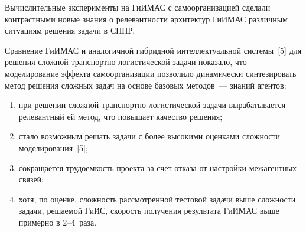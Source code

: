 \begin{multicols}{2}
  Вычислительные эксперименты на ГиИМАС с самоорганизацией сделали 
контрастными новые знания о релевантности архитектур ГиИМАС различным 
ситуациям решения задачи в СППР. 

Сравнение \mbox{ГиИМАС} и аналогичной 
гибридной интеллектуальной системы~[5] для решения сложной транс\-порт\-но-ло\-ги\-сти\-че\-ской 
задачи показало, что моделирование эффекта самоорганизации 
позволило динамически синтезировать метод решения сложных задач на основе 
базовых методов~--- знаний агентов: 
\begin{enumerate}[(1)]
\item при решении сложной транс\-порт\-но-ло\-ги\-сти\-че\-ской 
задачи вырабатывается релевантный ей метод, что повышает 
качество решения; 
\item стало возможным решать задачи с более высокими 
оценками сложности моделирования~[5]; 
\item сокращается трудоемкость 
проекта за счет отказа от настройки межагентных связей; 
\item хотя, по оценке, 
сложность рассмотренной тес\-то\-вой задачи выше сложности задачи, решаемой 
\mbox{ГиИС}, скорость получения результата \mbox{ГиИМАС} выше примерно в 
  2--4~раза. 
  \end{enumerate}
  
  {\small\frenchspacing
{%
\begin{thebibliography}{99}


\end{thebibliography}}}
\end{multicols}
